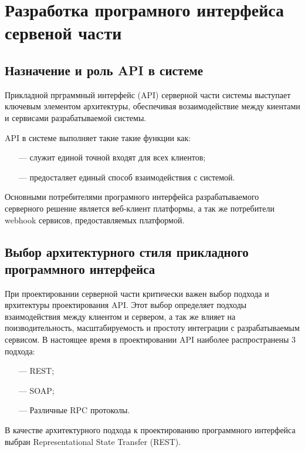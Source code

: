 \section{Разработка програмного интерфейса сервеной чаcти}

\subsection{Назначение и роль API в системе}

Прикладной прграммный интерфейс (API) \cite{ong2015materials} серверной части системы выступает ключевым элементом архитектуры, обеспечивая возаимодействие между киентами и сервисами разрабатываемой системы.

API в системе выполняет такие такие функции как:

\begin{itemize}
  \item[---] служит единой точной входят для всех клиентов;
  \item[---] предосталяет единый способ взаимодействия с системой.
\end{itemize}

Основными потребителями програмного интерфейса разрабатываемого серверного решение является веб-клиент платформы, а так же потребители webhook\cite{biehl2017webhooks} сервисов, предоставляемых платформой.

\subsection{Выбор архитектурного стиля прикладного программного интерфейса}

При проектировании серверной части критически важен выбор подхода и врхитектуры проектирования API.
Этот выбор определяет подходы взаимодействия между клиентом и сервером, а так же влияет на поизводительность, масштабируемость и простоту интеграции с разрабатываемым сервисом.
В настоящее время в проектировании API наиболее распространены 3 подхода: 

\begin{itemize}
  \item[---] REST\cite{wilde2011rest};
  \item[---] SOAP\cite{box2000simple};
  \item[---] Различные RPC протоколы\cite{srinivasan1995rpc}. 
\end{itemize}

В качестве архитектурного подхода к проектированию программного интерфейса выбран Representational State Transfer (REST).

